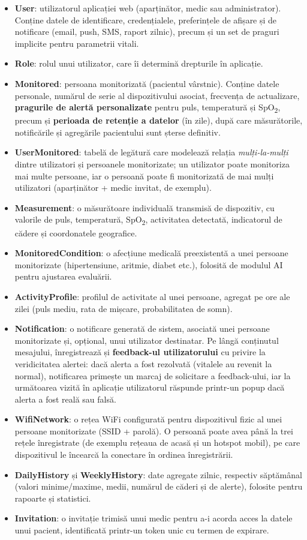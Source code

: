 ﻿\documentclass[12pt,a4paper,twoside]{article}
\newcommand{\spo}{SpO\textsubscript{2}}
\begin{document}
\begin{itemize}[leftmargin=1.5em]
\item \textbf{User}: utilizatorul aplicației web (aparținător, medic sau administrator). Conține datele de identificare, credențialele, preferințele de afișare și de notificare (email, push, SMS, raport zilnic), precum și un set de praguri implicite pentru parametrii vitali.
\item \textbf{Role}: rolul unui utilizator, care îi determină drepturile în aplicație.
\item \textbf{Monitored}: persoana monitorizată (pacientul vârstnic). Conține datele personale, numărul de serie al dispozitivului asociat, frecvența de actualizare, \textbf{pragurile de alertă personalizate} pentru puls, temperatură și \spo, precum și \textbf{perioada de retenție a datelor} (în zile), după care măsurătorile, notificările și agregările pacientului sunt șterse definitiv.
\item \textbf{UserMonitored}: tabelă de legătură care modelează relația \textit{mulți-la-mulți} dintre utilizatori și persoanele monitorizate; un utilizator poate monitoriza mai multe persoane, iar o persoană poate fi monitorizată de mai mulți utilizatori (aparținător + medic invitat, de exemplu).
\item \textbf{Measurement}: o măsurătoare individuală transmisă de dispozitiv, cu valorile de puls, temperatură, \spo, activitatea detectată, indicatorul de cădere și coordonatele geografice.
\item \textbf{MonitoredCondition}: o afecțiune medicală preexistentă a unei persoane monitorizate (hipertensiune, aritmie, diabet etc.), folosită de modulul AI pentru ajustarea evaluării.
\item \textbf{ActivityProfile}: profilul de activitate al unei persoane, agregat pe ore ale zilei (puls mediu, rata de mișcare, probabilitatea de somn).
\item \textbf{Notification}: o notificare generată de sistem, asociată unei persoane monitorizate și, opțional, unui utilizator destinatar. Pe lângă conținutul mesajului, înregistrează și \textbf{feedback-ul utilizatorului} cu privire la veridicitatea alertei: dacă alerta a fost rezolvată (vitalele au revenit la normal), notificarea primește un marcaj de solicitare a feedback-ului, iar la următoarea vizită în aplicație utilizatorul răspunde printr-un popup dacă alerta a fost reală sau falsă.
\item \textbf{WifiNetwork}: o rețea WiFi configurată pentru dispozitivul fizic al unei persoane monitorizate (SSID + parolă). O persoană poate avea până la trei rețele înregistrate (de exemplu rețeaua de acasă și un hotspot mobil), pe care dispozitivul le încearcă la conectare în ordinea înregistrării.
\item \textbf{DailyHistory} și \textbf{WeeklyHistory}: date agregate zilnic, respectiv săptămânal (valori minime/maxime, medii, numărul de căderi și de alerte), folosite pentru rapoarte și statistici.
\item \textbf{Invitation}: o invitație trimisă unui medic pentru a-i acorda acces la datele unui pacient, identificată printr-un token unic cu termen de expirare.
\end{itemize}
\end{document}
